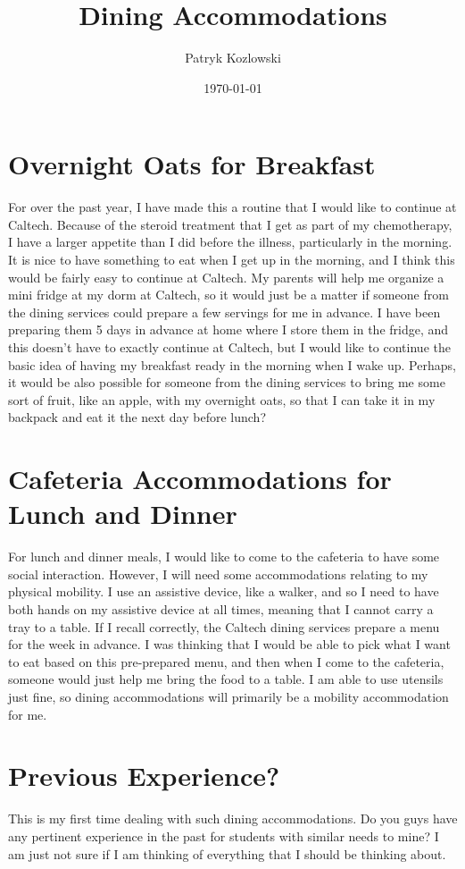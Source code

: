 \documentclass[12pt]{article}
\title{Dining Accommodations}
\author{Patryk Kozlowski}
\date{\today}
\begin{document}
\maketitle
\section{Overnight Oats for Breakfast}
For over the past year, I have made this a routine that I would like to continue at Caltech. Because of the steroid treatment that I get as part of my chemotherapy, I have a larger appetite than I did before the illness, particularly in the morning. It is nice to have something to eat when I get up in the morning, and I think this would be fairly easy to continue at Caltech. My parents will help me organize a mini fridge at my dorm at Caltech, so it would just be a matter if someone from the dining services could prepare a few servings for me in advance. I have been preparing them 5 days in advance at home where I store them in the fridge, and this doesn't have to exactly continue at Caltech, but I would like to continue the basic idea of having my breakfast ready in the morning when I wake up. Perhaps, it would be also possible for someone from the dining services to bring me some sort of fruit, like an apple, with my overnight oats, so that I can take it in my backpack and eat it the next day before lunch?

\section{Cafeteria Accommodations for Lunch and Dinner}
For lunch and dinner meals, I would like to come to the cafeteria to have some social interaction. However, I will need some accommodations relating to my physical mobility. I use an assistive device, like a walker, and so I need to have both hands on my assistive device at all times, meaning that I cannot carry a tray to a table. If I recall correctly, the Caltech dining services prepare a menu for the week in advance. I was thinking that I would be able to pick what I want to eat based on this pre-prepared menu, and then when I come to the cafeteria, someone would just help me bring the food to a table. I am able to use utensils just fine, so dining accommodations will primarily be a mobility accommodation for me.

\section{Previous Experience?}
This is my first time dealing with such dining accommodations. Do you guys have any pertinent experience in the past for students with similar needs to mine? I am just not sure if I am thinking of everything that I should be thinking about.
\end{document}
